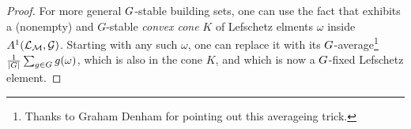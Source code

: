 \begin{proof}
For more general $G$-stable building sets, one can use
the fact that \cite[Thm.~4.12]{PagariaPezzoli} exhibits a (nonempty) and $G$-stable {\it convex cone} $K$ of Lefschetz elments $\omega$ inside $A^1(\mathcal{L}_{\mathcal{M}},\mathcal{G})$.  Starting with
any such $\omega$, one can replace it with its $G$-average\footnote{Thanks to Graham Denham for pointing out this averageing trick.} $\frac{1}{|G|} \sum_{g \in G} g(\omega)$, which is also
in the cone $K$,
and which is now a $G$-fixed Lefschetz element.
\end{proof}

